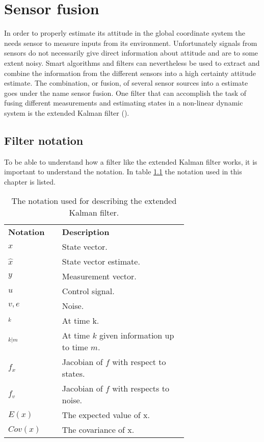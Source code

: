 \chapter{Sensor fusion}
In order to properly estimate its attitude in the global coordinate system the \abbrROV needs sensor to measure inputs from its environment.
Unfortunately signals from sensors do not necessarily give direct information about attitude and are to some extent noisy. Smart algorithms and filters can nevertheless be used to extract and combine the information from the different sensors into a high certainty attitude estimate. The combination, or fusion, of several sensor sources into a estimate goes under the name sensor fusion. One filter that can accomplish the task of fusing different measurements and estimating states in a non-linear dynamic system is the extended Kalman filter (\abbrEKF). 
\section{Filter notation}
To be able to understand how a filter like the extended Kalman filter works, it is important to understand the notation. In table \ref{tab:notationKalman} the notation used in this chapter is listed.
 \begin{table}[htbp]
  \centering
  \caption{\label{tab:notationKalman}%
    The notation used for describing the extended Kalman filter.}
    \begin{tabular}{l p{0.7\linewidth}}
    \toprule%
    \textbf{Notation} & \textbf{Description} \\
    \otoprule%
    $x$ & State vector.\\
    $\hat{x}$ & State vector estimate.\\
    $y$    & Measurement vector.\\
    $u$ & Control signal.\\
    $v,e$ & Noise.\\
    $_k$ & At time k.\\
    $_{k|m}$ & At time $k$ given information up to time $m$.\\
    $f_x$ & Jacobian of $f$ with respect to states.\\
    $f_v$ & Jacobian of $f$ with respects to noise.\\
    $E(x)$ & The expected value of x.\\
    $Cov(x)$ & The covariance of x.\\
    \bottomrule%
 \end{tabular}
\end{table}

